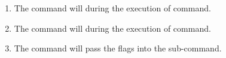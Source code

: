\begin{example}{}
    \begin{enumerate}
        \item {The  command will  during the execution of  command.}
        \item {The  command will  during the execution of  command.}
        \item {The  command will pass the flags into the  sub-command.}
    \end{enumerate}
\end{example}


